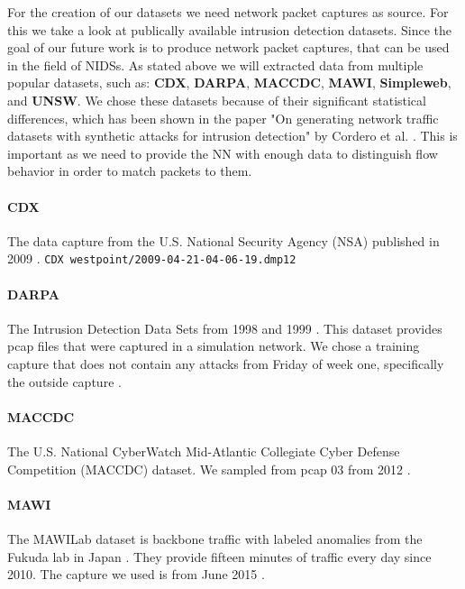 \documentclass[
	ngerman,
	ruledheaders=section,%
	class=report,%
	thesis={type=bachelor},%
	accentcolor=9c,%
	custommargins=true,%
	marginpar=false,%
	parskip=half-,%
	fontsize=11pt,%
]{tudapub}
\begin{document}
For the creation of our datasets we need network packet captures as source.
For this we take a look at publically available intrusion detection datasets.
Since the goal of our future work is to produce network packet captures, that can be used in the field of NIDSs.
As stated above we will extracted data from multiple popular datasets, such as: \textbf{CDX}, \textbf{DARPA}, \textbf{MACCDC}, \textbf{MAWI}, \textbf{Simpleweb}, and \textbf{UNSW}.
We chose these datasets because of their significant statistical differences, which has been shown in the paper "On generating network traffic datasets with synthetic attacks for intrusion detection" by Cordero et al. \cite{corderoGeneratingNetworkTraffic2019}.
This is important as we need to provide the NN with enough data to distinguish flow behavior in order to match packets to them.

\paragraph{CDX} The data capture from the U.S. National Security Agency (NSA) published in 2009 \cite{CyberResearchCenter}.
\lstinline{CDX westpoint/2009-04-21-04-06-19.dmp12}

\paragraph{DARPA} The Intrusion Detection Data Sets from 1998 and 1999 \cite{1999DARPAIntrusion}.
This dataset provides pcap files that were captured in a simulation network.
We chose a training capture that does not contain any attacks from Friday of week one, specifically the outside capture \cite{MITLincolnLaboratory}.

\paragraph{MACCDC} The U.S. National CyberWatch Mid-Atlantic Collegiate Cyber Defense Competition (MACCDC) dataset.
We sampled from pcap 03 from 2012 \cite{PCAPFilesUS}.

\paragraph{MAWI} The MAWILab dataset is backbone traffic with labeled anomalies from the Fukuda lab in Japan \cite{MAWILabHome}.
They provide fifteen minutes of traffic every day since 2010. The capture we used is from June 2015 \cite{MAWILabDataSeta}.
\end{document}
